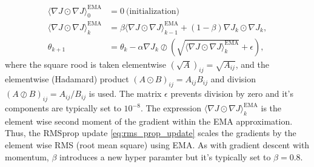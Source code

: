 \documentclass[12pt,a4paper]{article}
\begin{document}
\begin{align}
	\langle \nabla J  \odot \nabla J\rangle ^{\text{EMA}}_0 &= 0   ~ \text{(initialization)}\\ 
		\langle \nabla J  \odot \nabla J\rangle^{\text{EMA}}_k &= \beta \langle \nabla J  \odot \nabla J\rangle^{\text{EMA}}_{k -1} + (1-\beta) \nabla J_k  \odot \nabla J_k, \\
	   \theta_{k+1} &= \theta_k - \alpha \nabla J_k \oslash \left(\sqrt{\langle \nabla J  \odot \nabla J\rangle^{\text{EMA}}_k} + \epsilon \right), \label{eq:rms_prop_update} 
\end{align} 
where the square rood is taken elementwise $(\sqrt{A})_{ij} = \sqrt{A_{ij}}$, and  the  elementwise
 (Hadamard) product $\left(A\odot B\right)_{ij} = A_{ij} B_{ij}$ and division  $\left(A\oslash B\right)_{ij} = A_{ij} / B_{ij}$ is used. The matrix $\epsilon$ prevents division by zero and it's components are typically set to $10^{-8}$. The expression $\langle \nabla J  \odot \nabla J\rangle^{\text{EMA}}_k$ is the element wise second moment of the gradient within the EMA approximation. Thus, the RMSprop update \ref{eq:rms_prop_update} scales the gradients by the element wise RMS (root mean square) using EMA. As with gradient descent with momentum, $\beta$ introduces a new hyper paramter but it's typically set to $\beta=0.8$.
\end{document}
